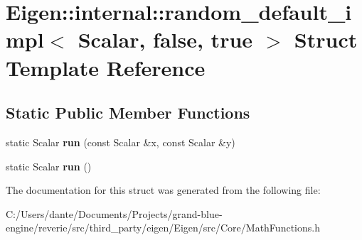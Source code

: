 \hypertarget{struct_eigen_1_1internal_1_1random__default__impl_3_01_scalar_00_01false_00_01true_01_4}{}\section{Eigen\+::internal\+::random\+\_\+default\+\_\+impl$<$ Scalar, false, true $>$ Struct Template Reference}
\label{struct_eigen_1_1internal_1_1random__default__impl_3_01_scalar_00_01false_00_01true_01_4}
\subsection*{Static Public Member Functions}
\begin{DoxyCompactItemize}
\item 
\mbox{\label{struct_eigen_1_1internal_1_1random__default__impl_3_01_scalar_00_01false_00_01true_01_4_a886a72a3a348f8948b8d016aa22450ec}} 
static Scalar {\bfseries run} (const Scalar \&x, const Scalar \&y)
\item 
\mbox{\label{struct_eigen_1_1internal_1_1random__default__impl_3_01_scalar_00_01false_00_01true_01_4_a7f987ff0f5fb89beaf33c32d1094536e}} 
static Scalar {\bfseries run} ()
\end{DoxyCompactItemize}


The documentation for this struct was generated from the following file\+:\begin{DoxyCompactItemize}
\item 
C\+:/\+Users/dante/\+Documents/\+Projects/grand-\/blue-\/engine/reverie/src/third\+\_\+party/eigen/\+Eigen/src/\+Core/Math\+Functions.\+h\end{DoxyCompactItemize}
